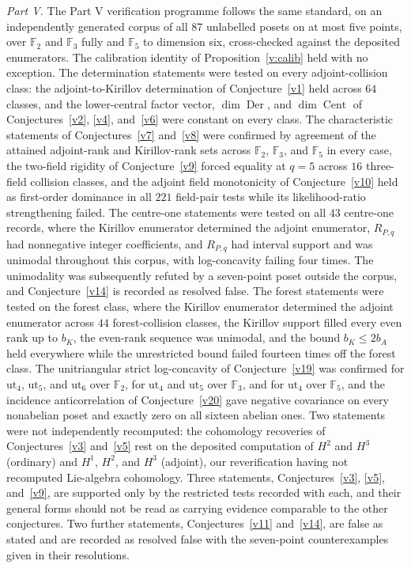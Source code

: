 \documentclass[11pt]{article}
\theoremstyle{definition}
\newcommand{\Fq}{\mathbb F}
\begin{document}
\emph{Part V.}  The Part V verification programme follows the same standard, on an independently generated corpus of all $87$ unlabelled posets on at most five points, over $\Fq_2$ and $\Fq_3$ fully and $\Fq_5$ to dimension six, cross-checked against the deposited enumerators.  The calibration identity of Proposition~\ref{v:calib} held with no exception.  The determination statements were tested on every adjoint-collision class: the adjoint-to-Kirillov determination of Conjecture~\ref{v1} held across $64$ classes, and the lower-central factor vector, $\dim\operatorname{Der}$, and $\dim\operatorname{Cent}$ of Conjectures~\ref{v2}, \ref{v4}, and~\ref{v6} were constant on every class.  The characteristic statements of Conjectures~\ref{v7} and~\ref{v8} were confirmed by agreement of the attained adjoint-rank and Kirillov-rank sets across $\Fq_2$, $\Fq_3$, and $\Fq_5$ in every case, the two-field rigidity of Conjecture~\ref{v9} forced equality at $q=5$ across $16$ three-field collision classes, and the adjoint field monotonicity of Conjecture~\ref{v10} held as first-order dominance in all $221$ field-pair tests while its likelihood-ratio strengthening failed.  The centre-one statements were tested on all $43$ centre-one records, where the Kirillov enumerator determined the adjoint enumerator, $R_{P,q}$ had nonnegative integer coefficients, and $R_{P,q}$ had interval support and was unimodal throughout this corpus, with log-concavity failing four times.  The unimodality was subsequently refuted by a seven-point poset outside the corpus, and Conjecture~\ref{v14} is recorded as resolved false.  The forest statements were tested on the forest class, where the Kirillov enumerator determined the adjoint enumerator across $44$ forest-collision classes, the Kirillov support filled every even rank up to $b_K$, the even-rank sequence was unimodal, and the bound $b_K\le 2b_A$ held everywhere while the unrestricted bound failed fourteen times off the forest class.  The unitriangular strict log-concavity of Conjecture~\ref{v19} was confirmed for $\mathrm{ut}_4$, $\mathrm{ut}_5$, and $\mathrm{ut}_6$ over $\Fq_2$, for $\mathrm{ut}_4$ and $\mathrm{ut}_5$ over $\Fq_3$, and for $\mathrm{ut}_4$ over $\Fq_5$, and the incidence anticorrelation of Conjecture~\ref{v20} gave negative covariance on every nonabelian poset and exactly zero on all sixteen abelian ones.  Two statements were not independently recomputed: the cohomology recoveries of Conjectures~\ref{v3} and~\ref{v5} rest on the deposited computation of $H^2$ and $H^3$ (ordinary) and $H^1$, $H^2$, and $H^3$ (adjoint), our reverification having not recomputed Lie-algebra cohomology.  Three statements, Conjectures~\ref{v3}, \ref{v5}, and~\ref{v9}, are supported only by the restricted tests recorded with each, and their general forms should not be read as carrying evidence comparable to the other conjectures.  Two further statements, Conjectures~\ref{v11} and~\ref{v14}, are false as stated and are recorded as resolved false with the seven-point counterexamples given in their resolutions.
\end{document}
